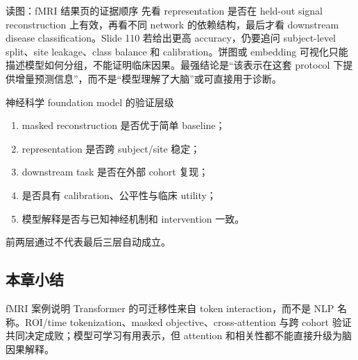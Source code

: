 








\begin{knowledgebox}{读图：fMRI 结果页的证据顺序}
先看 representation 是否在 held-out signal reconstruction 上有效，再看不同 network 的依赖结构，最后才看 downstream disease classification。Slide 110 若给出更高 accuracy，仍要追问 subject-level split、site leakage、class balance 和 calibration。饼图或 embedding 可视化只能描述模型如何分组，不能证明临床因果。最强结论是“该表示在这套 protocol 下提供增量预测信息”，而不是“模型理解了大脑”或可直接用于诊断。
\end{knowledgebox}


\begin{knowledgebox}{神经科学 foundation model 的验证层级}
\begin{enumerate}
  \item masked reconstruction 是否优于简单 baseline；
  \item representation 是否跨 subject/site 稳定；
  \item downstream task 是否在外部 cohort 复现；
  \item 是否具有 calibration、公平性与临床 utility；
  \item 模型解释是否与已知神经机制和 intervention 一致。
\end{enumerate}
前两层通过不代表最后三层自动成立。
\end{knowledgebox}

\subsection{本章小结}

fMRI 案例说明 Transformer 的可迁移性来自 token interaction，而不是 NLP 名称。ROI/time tokenization、masked objective、cross-attention 与跨 cohort 验证共同决定成败；模型可学习有用表示，但 attention 和相关性都不能直接升级为脑因果解释。

